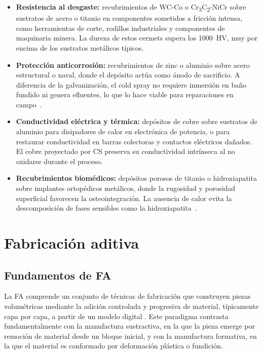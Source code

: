 \begin{itemize}
	\item \textbf{Resistencia al desgaste:} recubrimientos de WC-Co o 
	Cr\textsubscript{3}C\textsubscript{2}-NiCr sobre sustratos de acero 
	o titanio en componentes sometidos a fricción intensa, como herramientas 
	de corte, rodillos industriales y componentes de maquinaria minera. 
	La dureza de estos cermets supera los 1000~HV, muy por encima de los 
	sustratos metálicos típicos.
	
	\item \textbf{Protección anticorrosión:} recubrimientos de zinc o 
	aluminio sobre acero estructural o naval, donde el depósito actúa como 
	ánodo de sacrificio. A diferencia de la galvanización, el cold spray 
	no requiere inmersión en baño fundido ni genera efluentes, lo que lo 
	hace viable para reparaciones en campo~\cite{Champagne2016unique}.
	
	\item \textbf{Conductividad eléctrica y térmica:} depósitos de cobre 
	sobre sustratos de aluminio para disipadores de calor en electrónica 
	de potencia, o para restaurar conductividad en barras colectoras y 
	contactos eléctricos dañados. El cobre proyectado por CS preserva su 
	conductividad intrínseca al no oxidarse durante el proceso.
	
	\item \textbf{Recubrimientos biomédicos:} depósitos porosos de titanio 
	o hidroxiapatita sobre implantes ortopédicos metálicos, donde la 
	rugosidad y porosidad superficial favorecen la osteointegración. 
	La ausencia de calor evita la descomposición de fases sensibles 
	como la hidroxiapatita~\cite{Huang2020}.
\end{itemize}

\section{Fabricación aditiva}

\subsection{Fundamentos de FA}

La FA comprende un conjunto de técnicas de fabricación 
que construyen piezas volumétricas mediante la adición controlada y 
progresiva de material, típicamente capa por capa, a partir de un modelo 
digital \cite{Gibson2015}. Este paradigma contrasta fundamentalmente con la 
manufactura sustractiva, en la que la pieza emerge por remoción de material 
desde un bloque inicial, y con la manufactura formativa, en la que el 
material es conformado por deformación plástica o fundición.


